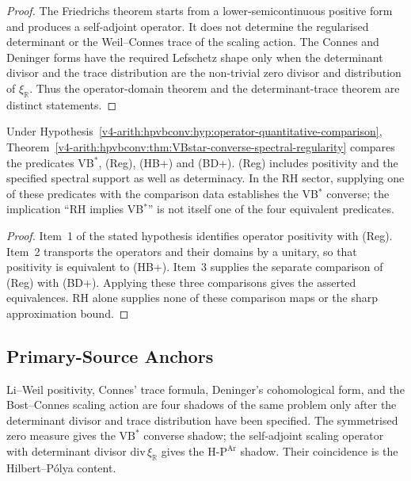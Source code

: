 \begin{proof}
The Friedrichs theorem starts from a lower-semicontinuous positive
form and produces a self-adjoint operator.  It does not determine the
regularised determinant or the Weil--Connes trace of the scaling
action.  The Connes and Deninger forms have the required Lefschetz
shape only when the determinant divisor and the trace distribution are
the non-trivial zero divisor and distribution of \(\xi_{\mathbb R}\).
Thus the operator-domain theorem and the determinant-trace theorem are
distinct statements.
\end{proof}

\begin{proposition}
Under Hypothesis~\ref{v4-arith:hpvbconv:hyp:operator-quantitative-comparison},
Theorem~\ref{v4-arith:hpvbconv:thm:VBstar-converse-spectral-regularity}
compares the predicates VB\(^{*}\), (Reg), (HB+) and (BD+).
(Reg) includes positivity and the specified spectral support as well
as determinacy. In the RH sector, supplying one of these predicates
with the comparison data establishes the VB\(^{*}\) converse;
the implication ``RH implies VB\(^{*}\)'' is not itself one of the
four equivalent predicates.
\end{proposition}

\begin{proof}
Item~1 of the stated hypothesis identifies operator positivity with
(Reg). Item~2 transports the operators and their domains by a unitary,
so that positivity is equivalent to (HB+). Item~3 supplies the separate
comparison of (Reg) with (BD+). Applying these three comparisons gives
the asserted equivalences. RH alone supplies none of these comparison
maps or the sharp approximation bound.
\end{proof}

\subsection{Primary-Source Anchors}
\label{v4-arith:w3-comparison-B:correction-A}

\begin{remark}
Li--Weil positivity, Connes' trace formula, Deninger's cohomological
form, and the Bost--Connes scaling action are four shadows of the same
problem only after the determinant divisor and trace distribution have
been specified.  The symmetrised zero measure gives the
\(\mathrm{VB}^{*}\) converse shadow; the self-adjoint scaling operator
with determinant divisor \(\mathrm{div}\,\xi_{\mathbb R}\) gives the
\(\mathrm{H}\text{-}\mathrm{P}^{\mathrm{Ar}}\) shadow.  Their
coincidence is the Hilbert--P\'olya content.
\end{remark}

